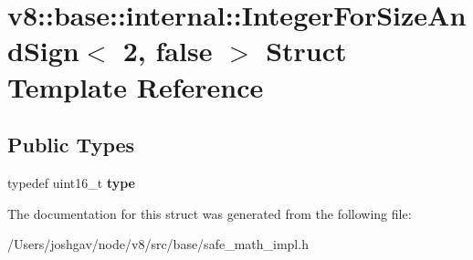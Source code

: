 \hypertarget{structv8_1_1base_1_1internal_1_1_integer_for_size_and_sign_3_012_00_01false_01_4}{}\section{v8\+:\+:base\+:\+:internal\+:\+:Integer\+For\+Size\+And\+Sign$<$ 2, false $>$ Struct Template Reference}
\label{structv8_1_1base_1_1internal_1_1_integer_for_size_and_sign_3_012_00_01false_01_4}
\subsection*{Public Types}
\begin{DoxyCompactItemize}
\item 
typedef uint16\+\_\+t {\bfseries type}\hypertarget{structv8_1_1base_1_1internal_1_1_integer_for_size_and_sign_3_012_00_01false_01_4_a30a5e48f695b39b9e5c96d43c264f498}{}\label{structv8_1_1base_1_1internal_1_1_integer_for_size_and_sign_3_012_00_01false_01_4_a30a5e48f695b39b9e5c96d43c264f498}

\end{DoxyCompactItemize}


The documentation for this struct was generated from the following file\+:\begin{DoxyCompactItemize}
\item 
/\+Users/joshgav/node/v8/src/base/safe\+\_\+math\+\_\+impl.\+h\end{DoxyCompactItemize}
